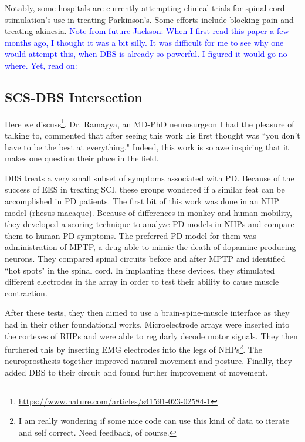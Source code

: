 Notably, some hospitals are currently attempting clinical trials for spinal cord stimulation's use in treating Parkinson's. Some efforts include blocking pain and treating akinesia. \textcolor{blue}{Note from future Jackson: When I first read this paper a few months ago, I thought it was a bit silly. It was difficult for me to see why one would attempt this, when DBS is already so powerful. I figured it would go no where. Yet, read on:}

\subsection{SCS-DBS Intersection}

Here we discuss\footnote{\url{https://www.nature.com/articles/s41591-023-02584-1}}. Dr. Ramayya, an MD-PhD neurosurgeon I had the pleasure of talking to, commented that after seeing this work his first thought was ``you don't have to be the best at everything." Indeed, this work is so awe inspiring that it makes one question their place in the field.\newline

DBS treats a very small subset of symptoms associated with PD. Because of the success of EES in treating SCI, these groups wondered if a similar feat can be accomplished in PD patients. The first bit of this work was done in an NHP model (rhesus macaque). Because of differences in monkey and human mobility, they developed a scoring technique to analyze PD models in NHPs and compare them to human PD symptoms. The preferred PD model for them was administration of MPTP, a drug able to mimic the death of dopamine producing neurons. They compared spinal circuits before and after MPTP and identified ``hot spots" in the spinal cord. In implanting these devices, they stimulated different electrodes in the array in order to test their ability to cause muscle contraction. \newline

After these tests, they then aimed to use a brain-spine-muscle interface as they had in their other foundational works. Microelectrode arrays were inserted into the cortexes of RHPs and were able to regularly decode motor signals. They then furthered this by inserting EMG electrodes into the legs of NHPs\footnote{I am really wondering if some nice code can use this kind of data to iterate and self correct. Need feedback, of course.}. The neuroprosthesis together improved natural movement and posture. Finally, they added DBS to their circuit and found further improvement of movement. \newline

